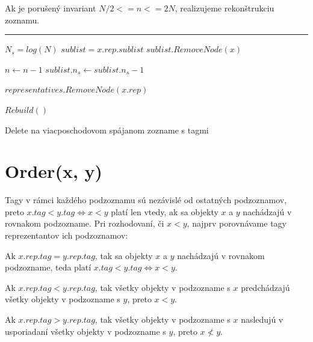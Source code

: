\documentclass[
  digital,     %
  oneside,     %
  nosansbold,  %
  nocolorbold, %
  lof,         %
  lot,         %
]{fithesis4}
\begin{document}
Ak je porušený invariant $N/2 <= n <= 2N$, realizujeme rekonštrukciu zoznamu.

\begin{algorithm}
\hrule\vspace{0.2em}
$N_s = log(N)$\;
$sublist = x.rep.sublist$\;
$sublist.RemoveNode(x)$\;

$n \leftarrow n - 1$\;
$sublist.n_s \leftarrow sublist.n_s - 1$\;

{
    $representatives.RemoveNode(x.rep)$\;
}

{
    $Rebuild()$\;
}
\caption{Delete na viacposchodovom spájanom zozname s tagmi}
\end{algorithm}


\section{Order(x, y)}

Tagy v rámci každého podzoznamu sú nezávislé od ostatných podzoznamov, preto $x.tag < y.tag \iff x < y$ platí len vtedy, ak sa objekty $x$ a $y$ nachádzajú v rovnakom podzozname.
Pri rozhodovaní, či $x < y$, najprv porovnávame tagy reprezentantov ich podzoznamov:
\begin{compactitem}
    \item{Ak $x.rep.tag = y.rep.tag$, tak sa objekty $x$ a $y$ nachádzajú v rovnakom podzozname, teda platí $x.tag < y.tag \iff x < y$.}
    \item{Ak $x.rep.tag < y.rep.tag$, tak všetky objekty v podzozname s $x$ predchádzajú všetky objekty v podzozname s $y$, preto $x < y$.}
    \item{Ak $x.rep.tag > y.rep.tag$, tak všetky objekty v podzozname s $x$ nasledujú v usporiadaní všetky objekty v podzozname s $y$, preto $x \nless y$.}
\end{compactitem}
\end{document}
